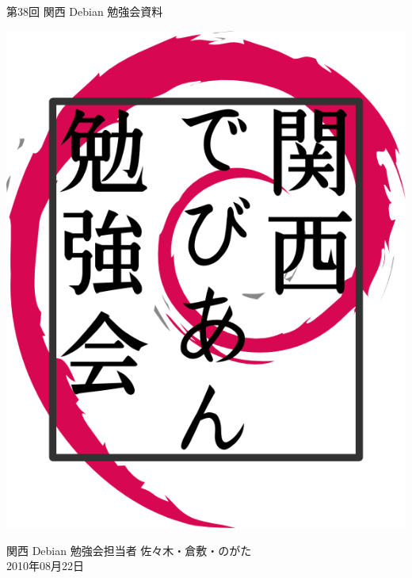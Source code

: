\documentclass[mingoth,a4paper]{jsarticle}
\newcommand{\debmtgyear}{2010}
\newcommand{\debmtgdate}{22}
\newcommand{\debmtgmonth}{08}
\newcommand{\debmtgnumber}{38}
\begin{document}
\begin{titlepage}


 第\debmtgnumber{}回 関西 Debian 勉強会資料

\vspace{2cm}

\begin{center}
\includegraphics{image200802/kansaidebianlogo.png}
\end{center}

\begin{flushright}
\hfill{}関西 Debian 勉強会担当者 佐々木・倉敷・のがた \\
\hfill{}\debmtgyear{}年\debmtgmonth{}月\debmtgdate{}日
\end{flushright}

\thispagestyle{empty}
\end{titlepage}


\subsection*{}%
 
\end{document}
